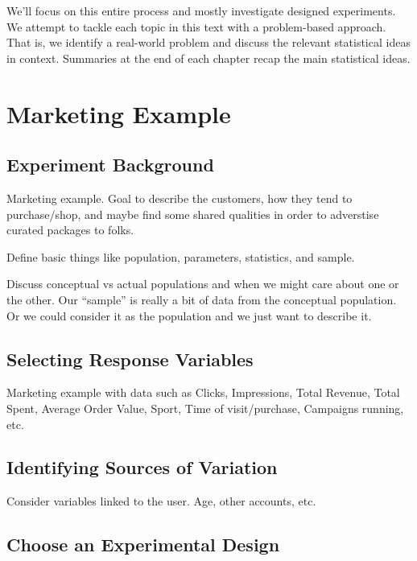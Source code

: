 \documentclass[]{book}
\theoremstyle{definition}
\theoremstyle{definition}
\theoremstyle{definition}
\theoremstyle{remark}
\begin{document}
We'll focus on this entire process and mostly investigate designed
experiments. We attempt to tackle each topic in this text with a
problem-based approach. That is, we identify a real-world problem and
discuss the relevant statistical ideas in context. Summaries at the end
of each chapter recap the main statistical ideas.

\section{Marketing Example}\label{marketing-example}

\subsection{Experiment Background}\label{experiment-background}

Marketing example. Goal to describe the customers, how they tend to
purchase/shop, and maybe find some shared qualities in order to
adverstise curated packages to folks.

Define basic things like population, parameters, statistics, and sample.

Discuss conceptual vs actual populations and when we might care about
one or the other. Our ``sample'' is really a bit of data from the
conceptual population. Or we could consider it as the population and we
just want to describe it.

\subsection{Selecting Response
Variables}\label{selecting-response-variables}

Marketing example with data such as Clicks, Impressions, Total Revenue,
Total Spent, Average Order Value, Sport, Time of visit/purchase,
Campaigns running, etc.

\subsection{Identifying Sources of
Variation}\label{identifying-sources-of-variation}

Consider variables linked to the user. Age, other accounts, etc.

\subsection{Choose an Experimental Design
}\label{choose-an-experimental-design}
\end{document}
